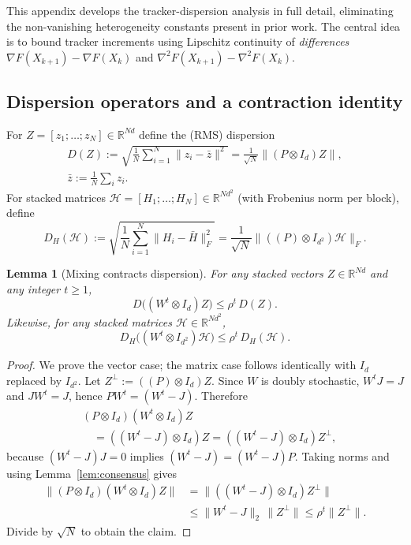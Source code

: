 \documentclass[11pt,a4paper]{article}
\def\one{1}%
\def\J{J}%
\def\Pmat{P}%
\newtheorem{lemma}[theorem]{Lemma}
\newcommand{\R}{\mathbb{R}}
\newcommand{\one}{\mathbf{1}}
\newcommand{\J}{\left(\frac{1}{N}\one\one^\top\right)}
\newcommand{\Pmat}{I-\J}
\begin{document}
This appendix develops the tracker-dispersion analysis in full detail,
eliminating the non-vanishing heterogeneity constants present in prior
work.
The central idea is to bound tracker increments using Lipschitz
continuity of \emph{differences}
$\nabla F(X_{k+1})-\nabla F(X_k)$ and
$\nabla^2F(X_{k+1})-\nabla^2F(X_k)$.

\subsection{Dispersion operators and a contraction identity}

For $Z=[z_1;\dots;z_N]\in\R^{Nd}$ define the (RMS) dispersion
\begin{gather*}
D(Z):=\sqrt{\tfrac1N\textstyle\sum_{i=1}^N\|z_i\!-\!\bar z\|^2}
=\tfrac{1}{\sqrt N}\|(\Pmat\!\otimes\! I_d)Z\|,\\
\bar z:=\tfrac1N\textstyle\sum_i z_i.
\end{gather*}
For stacked matrices $\mathcal H=[H_1;\dots;H_N]\in\R^{Nd^2}$ (with Frobenius norm per block),
define
\[
D_H(\mathcal H):=\sqrt{\frac1N\sum_{i=1}^N\|H_i-\bar H\|_F^2}
=\frac{1}{\sqrt N}\big\|((\Pmat)\otimes I_{d^2})\mathcal H\big\|_F.
\]

\begin{lemma}[Mixing contracts dispersion]\label{lem:mix_contract}
For any stacked vectors $Z\in\R^{Nd}$ and any integer $t\ge1$,
\[
D\big((W^t\otimes I_d)Z\big)\le \rho^t\,D(Z).
\]
Likewise, for any stacked matrices $\mathcal H\in\R^{Nd^2}$,
\[
D_H\big((W^t\otimes I_{d^2})\mathcal H\big)\le \rho^t\,D_H(\mathcal H).
\]
\end{lemma}
\begin{proof}
We prove the vector case; the matrix case follows identically with $I_d$ replaced by $I_{d^2}$.
Let $Z^\perp:=((\Pmat)\otimes I_d)Z$. Since $W$ is doubly stochastic, $W^t\J=\J$ and $\J W^t=\J$, hence
$\Pmat W^t=(W^t-\J)$. Therefore
\begin{align*}
&(\Pmat\!\otimes\! I_d)(W^t\!\otimes\! I_d)Z\\
&\quad=((W^t\!-\!\J)\!\otimes\! I_d)Z=((W^t\!-\!\J)\!\otimes\! I_d)Z^\perp,
\end{align*}
because $(W^t-\J)\J=0$ implies $(W^t-\J)=(W^t-\J)\Pmat$.
Taking norms and using Lemma~\ref{lem:consensus} gives
\begin{align*}
\|(\Pmat\!\otimes\! I_d)(W^t\!\otimes\! I_d)Z\|
&=\|((W^t\!-\!\J)\!\otimes\! I_d)Z^\perp\|\\
&\le \|W^t\!-\!\J\|_2\,\|Z^\perp\|
\le \rho^t\|Z^\perp\|.
\end{align*}
Divide by $\sqrt N$ to obtain the claim.
\end{proof}
\end{document}
